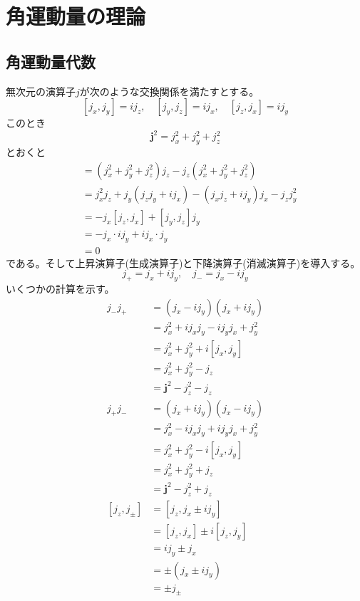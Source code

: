 \section{角運動量の理論}

\subsection{角運動量代数}
    無次元の演算子$j$が次のような交換関係を満たすとする。
        \[[j_x, j_y] = ij_z, \quad [j_y, j_z] = ij_x, \quad [j_z, j_x] = ij_y\]
    このとき
        \[\bm{j}^2 = j_x^2 + j_y^2 + j_z^2\]
    とおくと
    \begin{align*}
        [\bm{j}^2, j_z]
            &= (j_x^2 + j_y^2 + j_z^2)j_z - j_z(j_x^2 + j_y^2 + j_z^2)\\
            &= j_x^2j_z + j_y(j_zj_y + ij_x) - (j_xj_z + ij_y)j_x - j_zj_y^2\\
            &= -j_x[j_z, j_x] + [j_y, j_z]j_y\\
            &= -j_x \cdot ij_y + ij_x \cdot j_y\\
            &= 0
    \end{align*}
    である。そして上昇演算子(生成演算子)と下降演算子(消滅演算子)を導入する。
        \[j_+ = j_x + ij_y, \quad j_- = j_x - ij_y\]
    いくつかの計算を示す。
    \begin{align*}
        j_-j_+
            &= (j_x - ij_y)(j_x + ij_y)\\
            &= j_x^2 + ij_xj_y - ij_yj_x + j_y^2\\
            &= j_x^2 + j_y^2 + i[j_x, j_y]\\
            &= j_x^2 + j_y^2 - j_z\\
            &= \bm{j}^2 - j_z^2 - j_z\\
        j_+j_-
            &= (j_x + ij_y)(j_x - ij_y)\\
            &= j_x^2 - ij_xj_y + ij_yj_x + j_y^2\\
            &= j_x^2 + j_y^2 - i[j_x, j_y]\\
            &= j_x^2 + j_y^2 + j_z\\
            &= \bm{j}^2 - j_z^2 + j_z\\
        [j_z, j_{\pm}]
            &= [j_z, j_x \pm ij_y]\\
            &= [j_z, j_x] \pm i[j_z, j_y]\\
            &= ij_y \pm j_x\\
            &= \pm (j_x \pm ij_y)\\
            &= \pm j_{\pm}
    \end{align*}

